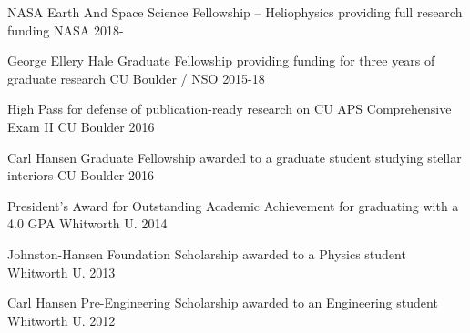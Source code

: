 



\begin{cvhonors}
  \cvhonor
    {NASA Earth And Space Science Fellowship -- Heliophysics} %
    {providing full research funding} %
    {NASA} %
    {2018-} %




  \cvhonor
    {George Ellery Hale Graduate Fellowship} %
    {providing funding for three years of graduate research} %
    {CU Boulder / NSO} %
    {2015-18} %

  \cvhonor
    {High Pass} %
    {for defense of publication-ready research on CU APS Comprehensive Exam II} %
    {CU Boulder} %
    {2016} %

  \cvhonor
    {Carl Hansen Graduate Fellowship} %
    {awarded to a graduate student studying stellar interiors} %
    {CU Boulder} %
    {2016} %

  \cvhonor
    {President's Award for Outstanding Academic Achievement} %
    {for graduating with a 4.0 GPA} %
    {Whitworth U.} %
    {2014} %

  \cvhonor
    {Johnston-Hansen Foundation Scholarship} %
    {awarded to a Physics student} %
    {Whitworth U.} %
    {2013} %

  \cvhonor
    {Carl Hansen Pre-Engineering Scholarship} %
    {awarded to an Engineering student} %
    {Whitworth U.} %
    {2012} %


\end{cvhonors}

